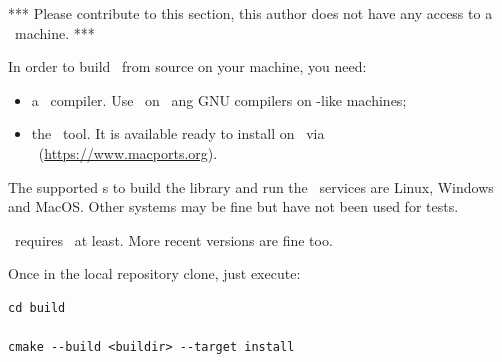 *** Please contribute to this section, this author does not have any access to a \Windows\ machine. ***

In order to build \mf\ from source on your machine, you need:
\begin{itemize}
\item a \CPlusplus\ compiler. Use \xcode\ on \MacOS\ ang GNU compilers on \Unix -like machines;
\item the \cmake\ tool. It is available ready to install on \MacOS\ via \macports\ (\url{https://www.macports.org}).
\end{itemize}

The supported \OS s to build the library and run the \CLI\ services are Linux, Windows and MacOS. Other systems may be fine but have not been used for tests.

\mf\ requires \CPlusplus\ at least. More recent versions are fine too.

Once in the local repository clone, just execute:
\begin{lstlisting}[language=Terminal]
cd build

cmake --build <buildir> --target install
\end{lstlisting}


